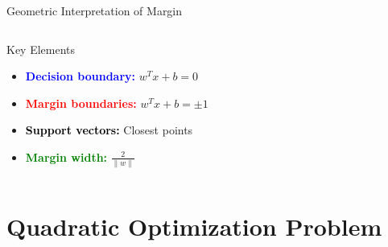 \documentclass[8pt,aspectratio=1610]{beamer}
\begin{document}
\begin{frame}{Geometric Interpretation of Margin}
\begin{columns}[t]
\begin{column}{0.48\textwidth}
\vspace{0.2cm}
\begin{block}{Key Elements}
\begin{itemize}
\setlength{\itemsep}{1pt}
\item \textcolor{blue}{\textbf{Decision boundary:}} $w^T x + b = 0$
\item \textcolor{red}{\textbf{Margin boundaries:}} $w^T x + b = \pm 1$
\item \textcolor{black}{\textbf{Support vectors:}} Closest points
\item \textcolor{green}{\textbf{Margin width:}} $\frac{2}{\|w\|}$
\end{itemize}
\end{block}
\end{column}
\end{columns}
\end{frame}

\section{Quadratic Optimization Problem}
\end{document}
